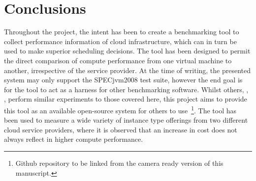\documentclass{llncs}
\begin{document}

\section{Conclusions}

Throughout the project, the intent has been to create a benchmarking tool to collect performance information of cloud infrastructure, which can in turn be used to make superior scheduling decisions. The tool has been designed to permit the direct comparison of compute performance from one virtual machine to another, irrespective of the service provider. At the time of writing, the presented system may only support the SPECjvm2008 test suite, however the end goal is for the tool to act as a harness for other benchmarking software. Whilst others, \cite{li2010cloudcmp}, \cite{chhetri2013smart}, perform similar experiments to those covered here, this project aims to provide this tool as an available open-source system for others to use~\footnote{Github repository to be linked from the camera ready version of this manuscript.}. The tool has been used to measure a wide variety of instance type offerings from two different cloud service providers, where it is observed that an increase in cost does not always reflect in higher compute performance.

%
%
 

\end{document}
